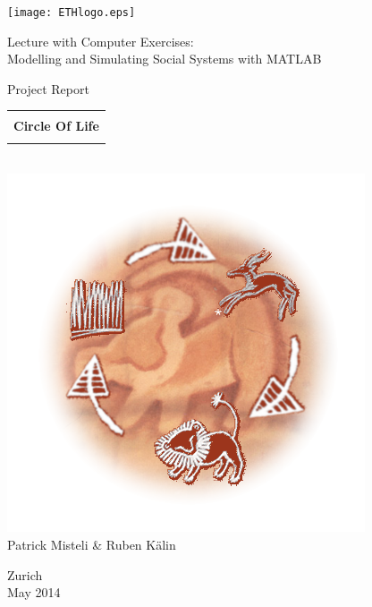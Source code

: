 
\thispagestyle{empty}

\begin{center}
\texttt{[image: ETHlogo.eps]}

\bigskip


\bigskip


\bigskip


\LARGE{ 	Lecture with Computer Exercises:\\ }
\LARGE{ Modelling and Simulating Social Systems with MATLAB\\}

\bigskip

\bigskip

\small{Project Report}\\

\bigskip

\bigskip

\bigskip

\bigskip


\begin{tabular}{|c|}
\hline
\\
\textbf{\LARGE{Circle Of Life}}\\
\\
\hline
\end{tabular}
\bigskip
\\
\includegraphics[scale=0.69]{images/circleEdited.png}\\
\bigskip
\LARGE{Patrick Misteli \& Ruben K{\"a}lin}

\bigskip

\bigskip

\bigskip

\bigskip

\bigskip

\bigskip

Zurich\\
May 2014\\

\end{center}


